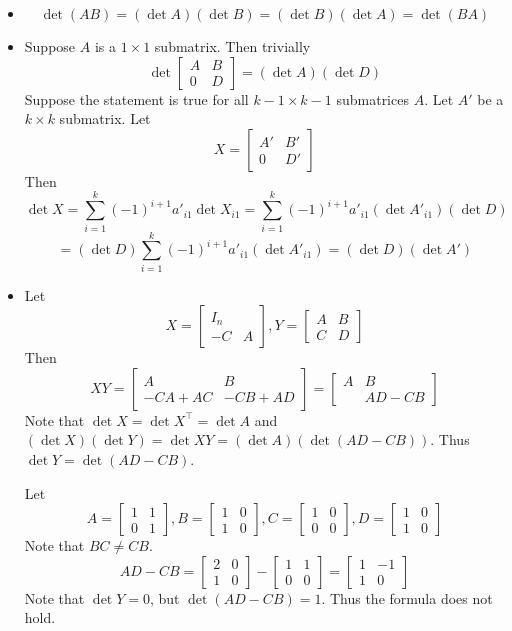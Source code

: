 \documentclass[12pt]{article}
\begin{document}
\begin{itemize}
$$\begin{bmatrix}
0 & 1
\end{bmatrix}\right) = ad - bc$$
\item[(11)]
$$\det(AB) = (\det A)(\det B) = (\det B)(\det A) = \det(BA)$$
\item[(12)]
Suppose $A$ is a $1 \times 1$ submatrix. Then trivially
$$\det\begin{bmatrix}
A & B \\
0 & D
\end{bmatrix} = (\det A)(\det D)$$
Suppose the statement is true for all $k - 1 \times k - 1$ submatrices $A$. Let $A'$ be a $k \times k$ submatrix. Let 
$$X = \begin{bmatrix}
A' & B' \\
0 & D'
\end{bmatrix}$$
Then
$$\det X = \sum_{i=1}^k (-1)^{i+1}a'_{i1}\det X_{i1} = \sum_{i=1}^k (-1)^{i+1}a'_{i1}(\det A'_{i1})(\det D)$$
$$= (\det D)\sum_{i=1}^k (-1)^{i+1}a'_{i1}(\det A'_{i1}) = (\det D)(\det A')$$
\item[(13)]
Let
$$X = \begin{bmatrix}
I_n \\
-C & A
\end{bmatrix}, Y = \begin{bmatrix}
A & B \\
C & D
\end{bmatrix}$$
Then
$$XY = \begin{bmatrix}
A & B \\
-CA + AC & -CB + AD
\end{bmatrix} = \begin{bmatrix}
A & B \\
& AD - CB
\end{bmatrix}$$
Note that $\det X = \det X^\top = \det A$ and  $(\det X)(\det Y) = \det XY = (\det A)(\det (AD - CB))$. Thus $\det Y = \det(AD - CB)$.

Let
$$A = \begin{bmatrix}
1 & 1 \\
0 & 1
\end{bmatrix}, B = \begin{bmatrix}
1 & 0 \\
1 & 0
\end{bmatrix}, C = \begin{bmatrix}
1 & 0 \\
0 & 0
\end{bmatrix}, D = \begin{bmatrix}
1 & 0 \\
1 & 0
\end{bmatrix}$$
Note that $BC \neq CB$.
$$AD - CB = \begin{bmatrix}
2 & 0 \\
1 & 0
\end{bmatrix} - \begin{bmatrix}
1 & 1 \\
0 & 0
\end{bmatrix} = \begin{bmatrix}
1 & -1 \\
1 & 0
\end{bmatrix}$$
Note that $\det Y = 0$, but $\det (AD - CB) = 1$. Thus the formula does not hold.
\end{itemize}
\end{document}
